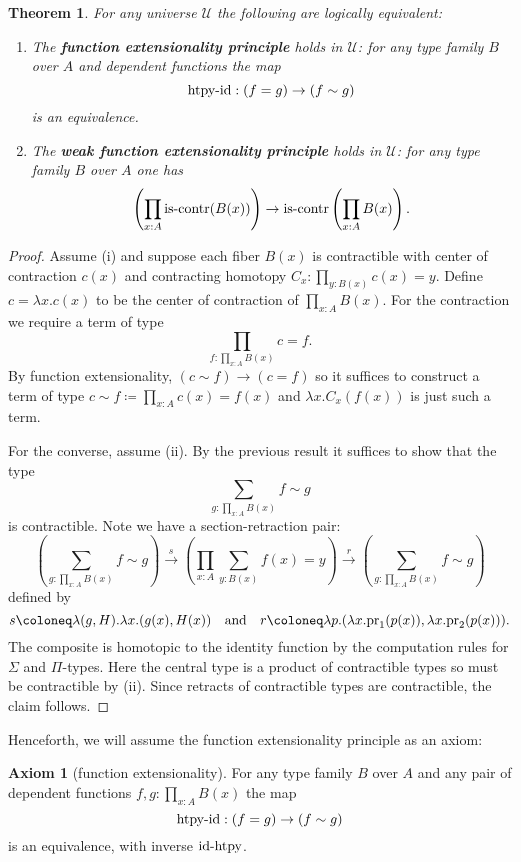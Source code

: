\documentclass{amsart}
\theoremstyle{theorem}
\newtheorem*{thm}{Theorem}
\theoremstyle{definition}
\newtheorem*{ax}{Axiom}
\theoremstyle{remark}
\newcommand{\0}{\mathbbe{0}}
\newcommand{\1}{\mathbbe{1}}
\newcommand{\2}{\mathbbe{2}}
\newcommand{\3}{\mathbbe{3}}
\newcommand{\4}{\mathbbe{4}}
\newcommand{\term}[1]{{\textup{#1}}}
\newcommand{\type}[1]{{\textup{#1}}}
\newcommand{\pr}{\term{pr}}
\newcommand{\UU}{{\mathcal{U}}}
\newcommand{\is}[1]{\type{is-{#1}}}
\begin{document}
\begin{thm} For any universe $\UU$ the following are logically equivalent:
\begin{enumerate}
\item The \textbf{function extensionality principle} holds in $\UU$: for any type family $B$ over $A$ and dependent functions the map
\[ \term{htpy-id} : (f=g) \to (f \sim g)\]
is an equivalence.
\item The \textbf{weak function extensionality principle} holds in $\UU$:  for any type family $B$ over $A$ one has
\[ \left( \prod_{x:A} \is{contr}(B(x)) \right) \to \is{contr}\left( \prod_{x:A}B(x)\right).\]
\end{enumerate}
\end{thm}
\begin{proof}
Assume (i) and suppose each fiber $B(x)$ is contractible with center of contraction $c(x)$ and contracting homotopy $C_x : \prod_{y : B(x)} c(x) = y$. Define $c = \lambda x. c(x)$ to be the center of contraction of $\prod_{x:A}B(x)$. For the contraction we require a term of type
\[ \prod_{f : \prod_{x : A}B(x)} c =f.\] By function extensionality,  $(c \sim f) \to (c=f)$ so it suffices to construct a term of type $c \sim f \coloneq \prod_{x:A} c(x)= f(x)$ and $\lambda x. C_x(f(x))$ is just such a term.

For the converse, assume (ii). By the previous result it suffices to show that the type
\[ \sum_{g : \prod_{x:A}B(x)} f \sim g\]
is contractible. Note we have a section-retraction pair:
\[ \left(\sum_{g : \prod_{x:A}B(x)} f \sim g \right) \xrightarrow{s} \left( \prod_{x:A}\sum_{y:B(x)} f(x) = y\right) \xrightarrow{r}
\left(\sum_{g : \prod_{x:A}B(x)} f \sim g \right) \]
defined by
\[ s \coloneq \lambda (g,H). \lambda x.(g(x),H(x)) \quad \text{and} \quad r \coloneq \lambda p. (\lambda x. \pr_1(p(x)), \lambda x. \pr_2(p(x))).\]
The composite is homotopic to the identity function by the computation rules for $\Sigma$ and $\Pi$-types. Here the central type is a product of contractible types so must be contractible by (ii). Since retracts of contractible types are contractible, the claim follows.
\end{proof}

Henceforth, we will assume the function extensionality principle as an axiom:

\begin{ax}[function extensionality] For any type family $B$ over $A$ and any pair of dependent functions $f,g : \prod_{x:A}B(x)$ the map
\[ \term{htpy-id} : (f=g) \to (f \sim g)\]
is an equivalence, with inverse $\term{id-htpy}$.
\end{ax}
\end{document}
